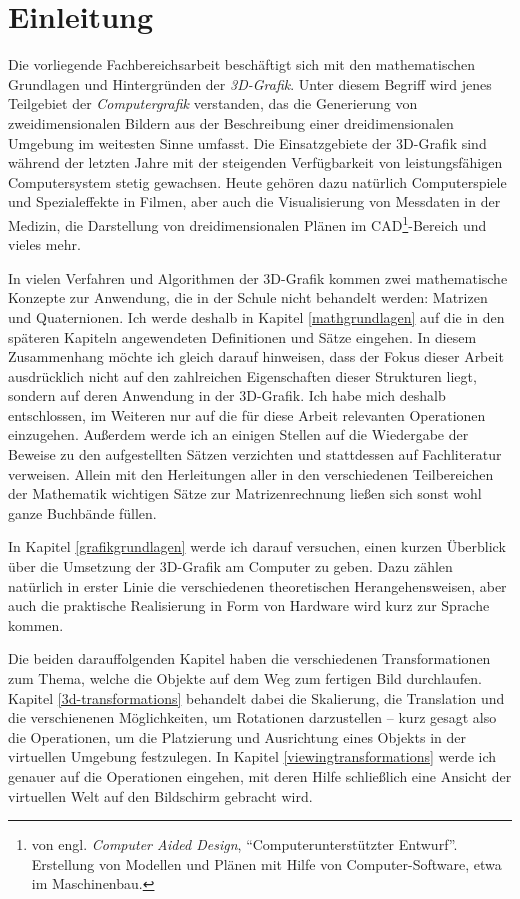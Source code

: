 \chapter{Einleitung}

Die vorliegende Fachbereichsarbeit beschäftigt sich mit den mathematischen Grundlagen und Hintergründen der \emph{3D-Grafik}. Unter diesem Begriff wird jenes Teilgebiet der \emph{Computergrafik} verstanden, das die Generierung von zweidimensionalen Bildern aus der Beschreibung einer dreidimensionalen Umgebung im weitesten Sinne umfasst. Die Einsatzgebiete der 3D-Grafik sind während der letzten Jahre mit der steigenden Verfügbarkeit von leistungsfähigen Computersystem stetig gewachsen. Heute gehören dazu natürlich Computerspiele und Spezialeffekte in Filmen, aber auch die Visualisierung von Messdaten in der Medizin, die Darstellung von dreidimensionalen Plänen im CAD\footnote{von engl. \emph{Computer Aided Design}, \enquote{Computerunterstützter Entwurf}. Erstellung von Modellen und Plänen mit Hilfe von Computer-Software, etwa im Maschinenbau.}-Bereich und vieles mehr.

In vielen Verfahren und Algorithmen der 3D-Grafik kommen zwei mathematische Konzepte zur Anwendung, die in der Schule nicht behandelt werden: Matrizen und Quaternionen. Ich werde deshalb in Kapitel \ref{mathgrundlagen} auf die in den späteren Kapiteln angewendeten Definitionen und Sätze eingehen. In diesem Zusammenhang möchte ich gleich darauf hinweisen, dass der Fokus dieser Arbeit ausdrücklich nicht auf den zahlreichen Eigenschaften dieser Strukturen liegt, sondern auf deren Anwendung in der 3D-Grafik.  Ich habe mich deshalb entschlossen, im Weiteren nur auf die für diese Arbeit relevanten Operationen einzugehen. Außerdem werde ich an einigen Stellen auf die Wiedergabe der Beweise zu den aufgestellten Sätzen verzichten und stattdessen auf Fachliteratur verweisen. Allein mit den Herleitungen aller in den verschiedenen Teilbereichen der Mathematik wichtigen Sätze zur Matrizenrechnung ließen sich sonst wohl ganze Buchbände füllen.


In Kapitel \ref{grafikgrundlagen} werde ich darauf versuchen, einen kurzen Überblick über die Umsetzung der 3D-Grafik am Computer zu geben. Dazu zählen natürlich in erster Linie die verschiedenen theoretischen Herangehensweisen, aber auch die praktische Realisierung in Form von Hardware wird kurz zur Sprache kommen.

Die beiden darauffolgenden Kapitel haben die verschiedenen Transformationen zum Thema, welche die Objekte auf dem Weg zum fertigen Bild durchlaufen. Kapitel \ref{3d-transformations} behandelt dabei die Skalierung, die Translation und die verschienenen Möglichkeiten, um Rotationen darzustellen -- kurz gesagt also die Operationen, um die Platzierung und Ausrichtung eines Objekts in der virtuellen Umgebung festzulegen. In Kapitel \ref{viewingtransformations} werde ich genauer auf die Operationen eingehen, mit deren Hilfe schließlich eine Ansicht der virtuellen Welt auf den Bildschirm gebracht wird.

